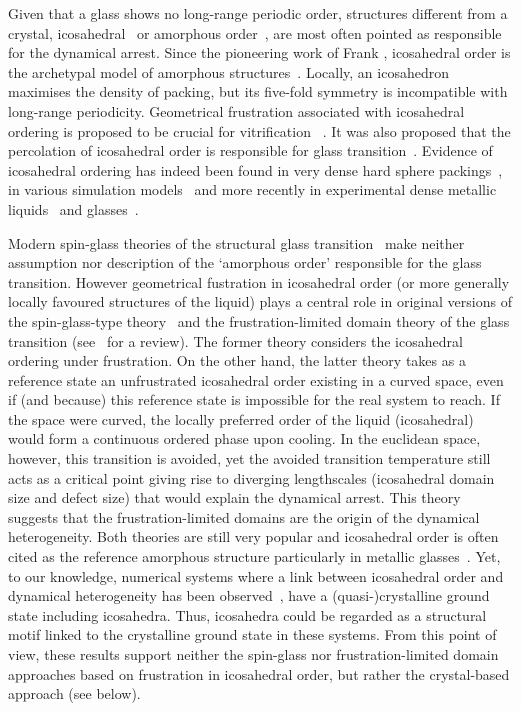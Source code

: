 Given that a glass shows no long-range periodic order, structures different from a crystal, icosahedral~\cite{steinhardt1983boo,sadoc1999geometrical, tarjus2005fba} or amorphous order~\cite{lubchenko2007}, are most often pointed as responsible for the dynamical arrest. Since the pioneering work of Frank \cite{Frank1952}, icosahedral order is the archetypal model of amorphous structures~\citep{Spaepen2000}. Locally, an icosahedron maximises the density of packing, but its five-fold symmetry is incompatible with long-range periodicity. Geometrical frustration associated with icosahedral ordering is proposed to be crucial for vitrification ~\cite{steinhardt1983boo,sadoc1999geometrical, tarjus2005fba}. It was also proposed that the percolation of icosahedral order is responsible for glass transition~\cite{Tomida1995}.  Evidence of icosahedral ordering has indeed been found in very dense hard sphere packings~\citep{Bernal1960, Clarke1993, Anikeenko2007, Malshe2011, Charbonneau}, in various simulation models~\citep{steinhardt1983boo, Tomida1995, Doye2003, Pedersen2010, Coslovich2011} and more recently in experimental dense metallic liquids~\citep{Reichert2000, Celino2007} and glasses~\citep{Luo2004, Wang2011}.

Modern spin-glass theories of the structural glass transition~\cite{lubchenko2007, Biroli2008, Parisi2010} make neither assumption nor description of the `amorphous order' responsible for the glass transition. However geometrical fustration in icosahedral order (or more generally locally favoured structures of the liquid) plays a central role in original versions of the spin-glass-type theory~\cite{steinhardt1983boo,sadoc1999geometrical} and the frustration-limited domain theory of the glass transition (see~\citep{tarjus2005fba} for a review). The former theory considers the icosahedral ordering under frustration. On the other hand, the latter theory takes as a reference state an unfrustrated icosahedral order existing in a curved space, even if (and because) this reference state is impossible for the real system to reach. If the space were curved, the locally preferred order of the liquid (icosahedral) would form a continuous ordered phase upon cooling. In the  euclidean space, however, this transition is avoided, yet the avoided transition temperature still acts as a critical point giving rise to diverging lengthscales (icosahedral domain size and defect size) that would explain the dynamical arrest. This theory suggests that the frustration-limited domains are the origin of the dynamical heterogeneity. Both theories are still very popular and icosahedral order is often cited as the reference amorphous structure particularly in metallic glasses~\citep{Reichert2000, Celino2007, Luo2004, Wang2011}. Yet, to our knowledge, numerical systems where a link between icosahedral order and dynamical heterogeneity has been observed~\citep{Doye2003, Pedersen2010, Coslovich2011}, have a (quasi-)crystalline ground state including icosahedra. Thus, icosahedra could be regarded as a structural motif linked to the crystalline ground state in these systems. From this point of view, these results support neither the spin-glass nor frustration-limited domain approaches based on frustration in icosahedral order, but rather the crystal-based approach (see below).

